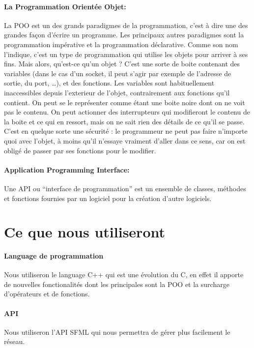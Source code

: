\documentclass[12pt,a4paper,twoside]{article}
\begin{document}
    \paragraph*{La Programmation Orientée Objet:\\}
    La POO est un des grands paradigmes de la programmation, c'est à dire une des grandes façon d'écrire un programme. Les principaux autres paradigmes sont la programmation impérative et la programmation déclarative. Comme son nom l'indique, c'est un type de programmation qui utilise les objets pour arriver à ses fins. Mais alors, qu'est-ce qu'un objet ? C'est une sorte de boite contenant des variables (dans le cas d'un socket, il peut s'agir par exemple de l'adresse de sortie, du port, …), et des fonctions. Les variables sont habituellement inaccessibles depuis l'exterieur de l'objet, contrairement aux fonctions qu'il contient. On peut se le représenter comme étant une boite noire dont on ne voit pas le contenu. On peut actionner des interrupteurs qui modifieront le contenu de la boite et ce qui en ressort, mais on ne sait rien des détails de ce qu'il se passe. C'est en quelque sorte une sécurité : le programmeur ne peut pas faire n'importe quoi avec l'objet, à moins qu'il n'essaye vraiment d'aller dans ce sens, car on est obligé de passer par ses fonctions pour le modifier.

    \paragraph*{Application Programming Interface:\\}
    Une API ou ``interface de programmation'' est un ensemble de classes, méthodes et fonctions fournies par un logiciel pour la création d'autre logiciels.

    \section{Ce que nous utiliseront}

    \paragraph*{Language de programmation\\}
    Nous utiliseron le language C++ qui est une évolution du C, en effet il apporte de nouvelles fonctionalités dont les principales sont la POO et la surcharge d'opérateurs et de fonctions.

    \paragraph*{API\\}
    Nous utiliseron l'API SFML qui nous permettra de gérer plus facilement le réseau.\\
\end{document}
